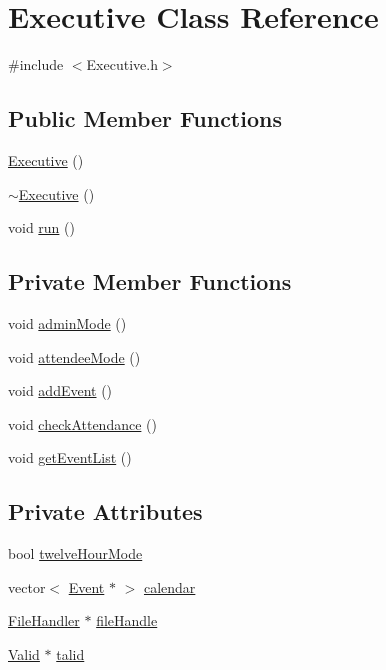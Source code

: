 \hypertarget{class_executive}{}\section{Executive Class Reference}
\label{class_executive}


{\ttfamily \#include $<$Executive.\+h$>$}

\subsection*{Public Member Functions}
\begin{DoxyCompactItemize}
\item 
\hyperlink{class_executive_ad870c1d741f1f313eb0c5a8336f8af6b}{Executive} ()
\item 
\hyperlink{class_executive_a4ce80c499f7640b1770ade77cf56d965}{$\sim$\+Executive} ()
\item 
void \hyperlink{class_executive_adef7cad3387e8fc79d92ffd418f45258}{run} ()
\end{DoxyCompactItemize}
\subsection*{Private Member Functions}
\begin{DoxyCompactItemize}
\item 
void \hyperlink{class_executive_af662ff9fa35251d64e4fe7cdfea14baf}{admin\+Mode} ()
\item 
void \hyperlink{class_executive_a56c8e76b140c48b0cc561619f1d4167c}{attendee\+Mode} ()
\item 
void \hyperlink{class_executive_a4040f7cecef181324a0dcbb5546faf47}{add\+Event} ()
\item 
void \hyperlink{class_executive_a9a557e6a6c0e9aa26f2af645a9a2b253}{check\+Attendance} ()
\item 
void \hyperlink{class_executive_ac98b519b4d5bc9f1354640fa5720a27d}{get\+Event\+List} ()
\end{DoxyCompactItemize}
\subsection*{Private Attributes}
\begin{DoxyCompactItemize}
\item 
bool \hyperlink{class_executive_a0d8c5ac39b849ace6ba439edbec23d26}{twelve\+Hour\+Mode}
\item 
vector$<$ \hyperlink{class_event}{Event} $\ast$ $>$ \hyperlink{class_executive_a408db6c2dc536dc7f53688da5a19a649}{calendar}
\item 
\hyperlink{class_file_handler}{File\+Handler} $\ast$ \hyperlink{class_executive_afdbcae01934f40960cf4955756e33950}{file\+Handle}
\item 
\hyperlink{class_valid}{Valid} $\ast$ \hyperlink{class_executive_a3c993d24ee13203a97736756e357f31d}{talid}
\end{DoxyCompactItemize}


